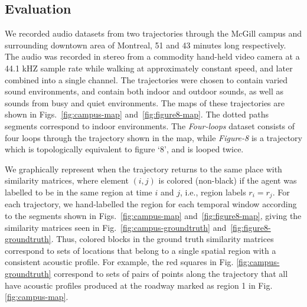 \subsection{Evaluation}

We recorded audio datasets from two trajectories through the McGill campus and surrounding downtown area of Montreal, 51 and 43 minutes long respectively. The audio was recorded in stereo from a commodity hand-held video camera at a 44.1 kHZ sample rate while walking at approximately constant speed, and later combined into a single channel. The trajectories were chosen to contain varied sound environments, and contain both indoor and outdoor sounds, as well as sounds from busy and quiet environments. The maps of these trajectories are shown in Figs.~\ref{fig:campus-map} and~\ref{fig:figure8-map}. The dotted paths segments correspond to indoor environments. The \emph{Four-loops} dataset consists of four loops through the trajectory shown in the map, while \emph{Figure-8} is a trajectory which is topologically equivalent to figure `8', and is looped twice.  

We graphically represent when the trajectory returns to the same place with similarity matrices, where element $(i,j)$ is colored (non-black) if the agent was labelled to be in the same region at time $i$ and $j$, i.e., region labels $r_i = r_j$. For each trajectory, we hand-labelled the region for each temporal window according to the segments shown in Figs.~\ref{fig:campus-map} and~\ref{fig:figure8-map}, giving the similarity matrices seen in Fig.~\ref{fig:campus-groundtruth} and~\ref{fig:figure8-groundtruth}. Thus, colored blocks in the ground truth similarity matrices correspond to sets of locations that belong to a single spatial region with a consistent acoustic profile. For example, the red squares in Fig. \ref{fig:campus-groundtruth} correspond to sets of pairs of points along the trajectory that all have acoustic profiles produced at the roadway marked as region 1 in Fig. \ref{fig:campus-map}. 


